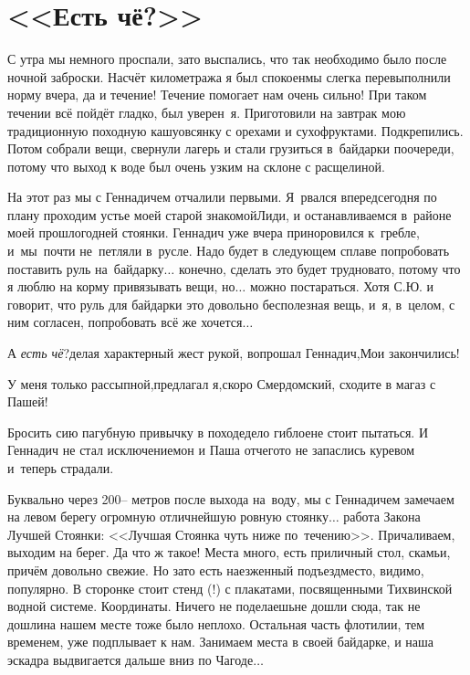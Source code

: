 \chapter{<<Есть чё?>>} 
\vepsianrose

С утра мы немного проспали, зато выспались, что так необходимо было после ночной заброски. Насчёт километража я был спокоен\mdash мы слегка перевыполнили норму вчера, да и течение! Течение помогает нам очень сильно! При таком течении всё пойдёт гладко, был уверен~я. Приготовили на завтрак мою традиционную походную кашу\mdash овсянку с орехами и сухофруктами. Подкрепились. Потом собрали вещи, свернули лагерь и стали грузиться в~байдарки по\sdash очереди, потому что выход к воде был очень узким на склоне с расщелиной. 

На этот раз мы с Геннадичем отчалили первыми. Я~рвался вперед\mdash  сегодня по плану проходим устье моей старой знакомой\mdash  Лиди, и останавливаемся в~районе моей прошлогодней стоянки. Геннадич уже вчера приноровился к~гребле, и~мы~почти не~петляли в~русле. Надо будет в следующем сплаве попробовать поставить руль на~байдарку$\ldots$ конечно, сделать это будет трудновато, потому что я люблю на корму привязывать вещи, но$\ldots$ можно постараться. Хотя С.Ю. и говорит, что руль для байдарки это довольно бесполезная вещь, и~я, в~целом, с ним согласен, попробовать всё же хочется$\ldots$ 

\diagdash А \textit{есть чё}?\mdash делая характерный жест рукой, вопрошал Геннадич,\mdash Мои закончились!

\diagdash У меня только рассыпной,\mdash предлагал я,\mdash скоро Смердомский, сходите в магаз с Пашей!

Бросить сию пагубную привычку в походе\mdash дело гиблое\mdash не стоит пытаться. И Геннадич не стал исключением\mdash он и Паша отчего\sdash то не запаслись куревом и~теперь страдали.

Буквально через 200\thinspace\nobreakdash-- метров после выхода на~воду, мы с Геннадичем замечаем на левом берегу огромную отличнейшую ровную стоянку$\ldots$  работа Закона Лучшей Стоянки: <<Лучшая Стоянка чуть ниже по~течению>>. Причаливаем, выходим на берег. Да что ж такое! Места много, есть приличный стол, скамьи, причём довольно свежие. Но зато есть наезженный подъезд\mdash  место, видимо, популярно. В сторонке стоит стенд (!) с плакатами, посвященными Тихвинской водной системе. Координаты\mdash \CoordsChagodaGood. Ничего не поделаешь\mdash не дошли сюда, так не дошли\mdash на нашем месте тоже было неплохо. Остальная часть флотилии, тем временем, уже подплывает к нам. Занимаем места в своей байдарке, и наша эскадра выдвигается дальше вниз по Чагоде$\ldots$  

